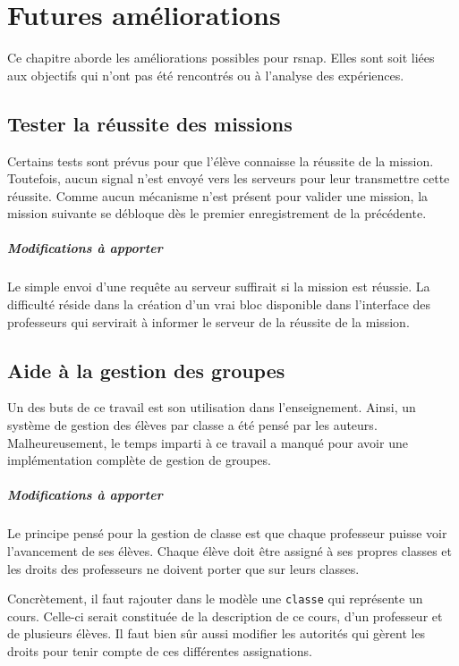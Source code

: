 \chapter{Futures améliorations}
Ce chapitre aborde les améliorations possibles pour \gls{rsnap}. Elles sont soit liées aux objectifs qui n'ont pas été rencontrés ou à l'analyse des expériences.

\section{Tester la réussite des missions}
Certains tests sont prévus pour que l'élève connaisse la réussite de la \gls{mission}. Toutefois, aucun signal n'est envoyé vers les serveurs pour leur transmettre cette réussite. Comme aucun mécanisme n'est présent pour valider une \gls{mission}, la \gls{mission} suivante se débloque dès le premier enregistrement de la précédente.

\paragraph{Modifications à apporter}
Le simple envoi d'une requête au serveur suffirait si la \gls{mission} est réussie. La difficulté réside dans la création d'un vrai \gls{bloc} disponible dans l'interface des professeurs qui servirait à informer le serveur de la réussite de la \gls{mission}.

\section{Aide à la gestion des groupes}
Un des buts de ce travail est son utilisation dans l'enseignement. Ainsi, un système de gestion des élèves par classe a été pensé par les auteurs. Malheureusement, le temps imparti à ce travail a manqué pour avoir une implémentation complète de gestion de groupes.

\paragraph{Modifications à apporter}
Le principe pensé pour la gestion de classe est que chaque professeur puisse voir l'avancement de ses élèves. Chaque élève doit être assigné à ses propres classes et les droits des professeurs ne doivent porter que sur leurs classes.

Concrètement, il faut rajouter dans le modèle une \texttt{classe} qui représente un cours. Celle-ci serait constituée de la description de ce cours, d'un professeur et de plusieurs élèves. Il faut bien sûr aussi modifier les autorités qui gèrent les droits pour tenir compte de ces différentes assignations.

